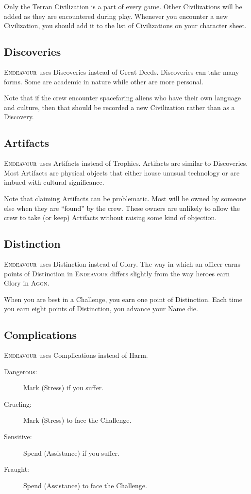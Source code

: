 \documentclass[11pt, a5paper, parskip=half-, DIV=12]{scrartcl}
\newcommand{\AGON}{\textsc{Agon}}%
\newcommand{\ENDEAVOUR}{\textsc{Endeavour}}%
\begin{document}
Only the Terran Civilization is a part of every game. Other Civilizations will be added as they are encountered during play. Whenever you encounter a new Civilization, you should add it to the list of Civilizations on your character sheet.

\subsection*{Discoveries}
\ENDEAVOUR{} uses Discoveries instead of Great Deeds. Discoveries can take many forms.  Some are academic in nature while other are more personal.

Note that if the crew encounter spacefaring aliens who have their own language and culture, then that should be recorded a new Civilization rather than as a Discovery.

\subsection*{Artifacts}
\ENDEAVOUR{} uses Artifacts instead of Trophies. Artifacts are similar to Discoveries. Most Artifacts are physical objects that either house unusual technology or are imbued with cultural significance.

Note that claiming Artifacts can be problematic. Most will be owned by someone else when they are ``found'' by the crew.  These owners are unlikely to allow the crew to take (or keep) Artifacts without raising some kind of objection.

\newpage

\subsection*{Distinction}
\ENDEAVOUR{} uses Distinction instead of Glory. The way in which an officer earns points of Distinction in \ENDEAVOUR{} differs slightly from the way heroes earn Glory in \AGON{}.

When you are best in a Challenge, you earn one point of Distinction. Each time you earn eight points of Distinction, you advance your Name die.

\subsection*{Complications}
\ENDEAVOUR{} uses Complications instead of Harm.
\begin{description}
	\item[Dangerous:] Mark  (Stress) if you suffer.
	\item[Grueling:] Mark  (Stress) to face the Challenge.
	\item[Sensitive:] Spend  (Assistance) if you suffer.
	\item[Fraught:] Spend  (Assistance) to face the Challenge.
\end{description}
\end{document}
